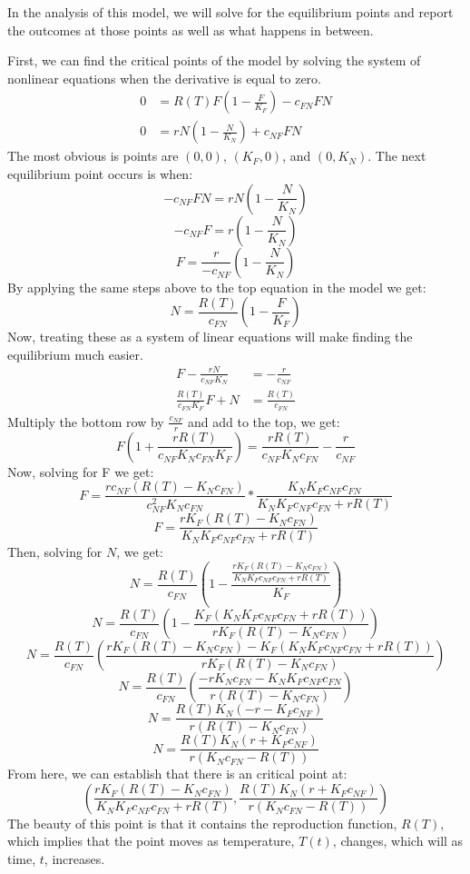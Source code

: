 In the analysis of this model, we will solve for the equilibrium points and report the outcomes at those points as well as what happens in between.

First, we can find the critical points of the model by solving the system of nonlinear equations when the derivative is equal to zero.
\[
\begin{aligned}
    0 &=R(T)F\left(1-\frac{F}{K_F}\right) - c_{FN}FN\\[.4cm]
    0 &=rN\left(1-\frac{N}{K_N}\right) + c_{NF}FN
\end{aligned}
\]
The most obvious is points are $(0,0)$, $(K_F,0)$, and $(0,K_N)$.
The next equilibrium point occurs is when:
\[
-c_{NF} FN= rN\left(1-\frac{N}{K_N}\right)
\]
\[
-c_{NF}F = r\left(1-\frac{N}{K_N}\right)
\]
\[
F = \frac{r}{-c_{NF}}\left(1-\frac{N}{K_N}\right)
\]
By applying the same steps above to the top equation in the model we get:
\[
N=\frac{R(T)}{c_{FN}}\left(1-\frac{F}{K_F}\right)
\]
Now, treating these as a system of linear equations will make finding the equilibrium much easier.
\[
\begin{aligned}
    F - \frac{rN}{c_{NF}K_N} &= -\frac{r}{c_{NF}}\\[.4cm]
    \frac{R(T)}{c_{FN}K_F}F + N &= \frac{R(T)}{c_{FN}}
\end{aligned}
\]
Multiply the bottom row by $\frac{c_{NF}}{r}$ and add to the top, we get:
\[
F\left(1+\frac{rR(T)}{c_{NF}K_Nc_{FN}K_F}\right) = \frac{rR(T)}{c_{NF}K_Nc_{FN}}-\frac{r}{c_{NF}}
\]
Now, solving for F we get:
\[
F = \frac{rc_{NF}\left(R(T)-K_Nc_{FN}\right)}{c_{NF}^2K_Nc_{FN}} * \frac{K_NK_Fc_{NF}c_{FN}}{K_NK_Fc_{NF}c_{FN}+rR(T)}
\]
\[
F = \frac{rK_F(R(T)-K_Nc_{FN})}{K_NK_Fc_{NF}c_{FN}+rR(T)}
\]
Then, solving for $N$, we get:
\[
N = \frac{R(T)}{c_{FN}}\left(1-\frac{\frac{rK_F(R(T)-K_Nc_{FN})}{K_NK_Fc_{NF}c_{FN}+rR(T)}}{K_F}\right)
\]
\[
N = \frac{R(T)}{c_{FN}}\left(1-\frac{K_F(K_NK_Fc_{NF}c_{FN}+rR(T))}{rK_F(R(T)-K_Nc_{FN})}\right)
\]
\[
N = \frac{R(T)}{c_{FN}}\left(\frac{rK_F(R(T)-K_Nc_{FN})-K_F(K_NK_Fc_{NF}c_{FN}+rR(T))}{rK_F(R(T)-K_Nc_{FN})}\right)
\]
\[
N = \frac{R(T)}{c_{FN}}\left(\frac{-rK_Nc_{FN}-K_NK_Fc_{NF}c_{FN}}{r(R(T)-K_Nc_{FN})}\right)
\]
\[
N = \frac{R(T)K_N(-r-K_Fc_{NF})}{r(R(T)-K_Nc_{FN})}
\]
\[
N = \frac{R(T)K_N(r+K_Fc_{NF})}{r(K_Nc_{FN}-R(T))}
\]
From here, we can establish that there is an critical point at:
\[
\left(\frac{rK_F(R(T)-K_Nc_{FN})}{K_NK_Fc_{NF}c_{FN}+rR(T)}, \frac{R(T)K_N(r+K_Fc_{NF})}{r(K_Nc_{FN}-R(T))}\right)
\]
The beauty of this point is that it contains the reproduction function, $R(T)$, which implies that the point moves as temperature, $T(t)$, changes, which will as time, $t$, increases.

